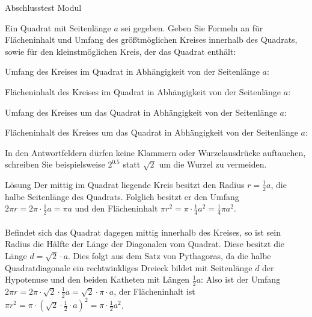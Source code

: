 \begin{MTest}{Abschlusstest Modul }
\begin{MExercise}
Ein Quadrat mit Seitenl\"ange $a$ sei gegeben. Geben Sie Formeln an f\"ur Fl\"acheninhalt und Umfang des gr\"o\ss tm\"oglichen Kreises innerhalb des Quadrats, sowie f\"ur
den kleinstm\"oglichen Kreis, der das Quadrat enth\"alt:
\begin{MExerciseItems}
\item{Umfang des Kreises im Quadrat in Abh\"angigkeit von der Seitenl\"ange $a$: }
\item{Fl\"acheninhalt des Kreises im Quadrat in Abh\"angigkeit von der Seitenl\"ange $a$: }
\item{Umfang des Kreises um das Quadrat in Abh\"angigkeit von der Seitenl\"ange $a$: }
\item{Fl\"acheninhalt des Kreises um das Quadrat in Abh\"angigkeit von der Seitenl\"ange $a$: }
\end{MExerciseItems}
\par
In den Antwortfeldern d\"urfen keine Klammern oder Wurzelausdr\"ucke auftauchen, schreiben Sie beispielsweise $2^{0.5}$ statt $\sqrt{2}$ um die Wurzel zu vermeiden.
\par
\begin{MHint}{L\"osung}
Der mittig im Quadrat liegende Kreis besitzt den Radius $r=\frac12a$, die halbe Seitenl\"ange des Quadrats. Folglich besitzt er den Umfang $2\pi r =2\pi \cdot \frac12a = \pi a$ und den Fl\"acheninhalt
$\pi r^2=\pi \cdot \frac14a^2 =\frac14\pi a^2$.\\
\ \\
Befindet sich das Quadrat dagegen mittig innerhalb des Kreises, so ist sein Radius die H\"alfte der L\"ange der Diagonalen vom Quadrat. Diese besitzt
die L\"ange $d=\sqrt2\cdot a$. Dies folgt aus dem Satz von Pythagoras, da die halbe Quadratdiagonale ein rechtwinkliges Dreieck bildet
mit Seitenl\"ange $d$ der Hypotenuse und den beiden Katheten mit L\"angen $\frac12a$: Also ist der Umfang $2\pi r=2\pi\cdot \sqrt2 \cdot\frac12 a=\sqrt2\cdot \pi \cdot a$,
der Fl\"acheninhalt ist $\pi r^2=\pi \cdot (\sqrt2\cdot \frac12\cdot a)^2=\pi \cdot\frac12 a^2$.
\end{MHint}
\end{MExercise}

\end{MTest}


